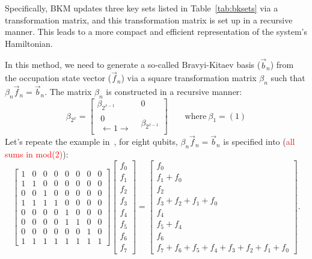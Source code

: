 Specifically, BKM updates three key sets listed in Table~\ref{tab:bksets} via a transformation matrix, and this transformation matrix is set up in a recursive manner. This leads to a more compact and efficient representation of the system's Hamiltonian.

In this method, we need to generate a so-called Bravyi-Kitaev basis ($\vec{b}_n$) from the occupation state vector ($\vec{f}_n$) via a square transformation matrix $\beta_n$ such that $\beta_n\vec{f}_n=\vec{b}_n$. The matrix $\beta_n$ is constructed in a recursive manner:
\begin{equation}
    \beta_{2^x}=\left[\begin{array}{c|c}
        \beta_{2^{x-1}} & 0 \\
        \hline
        \begin{matrix}
            0\\ \leftarrow 1 \rightarrow
        \end{matrix} & \beta_{2^{x-1}}
    \end{array}
        \right] \qquad \text{where} \: \beta_1=\left(1\right)
\end{equation}
Let's repeate the example in~\cite{transfer2015BKmapping}, for eight qubits, $\beta_n\vec{f}_n=\vec{b}_n$ is specified into (\textcolor{red}{all sums in mod(2)}): 
\begin{equation}
    \label{8bits}
    \begin{bmatrix}
        1&0&0&0&0&0&0&0\\
        1&1&0&0&0&0&0&0\\
        0&0&1&0&0&0&0&0\\
        1&1&1&1&0&0&0&0\\
        0&0&0&0&1&0&0&0\\
        0&0&0&0&1&1&0&0\\
        0&0&0&0&0&0&1&0\\
        1&1&1&1&1&1&1&1
    \end{bmatrix}
    \begin{bmatrix}
        f_0\\f_1\\f_2\\f_3\\f_4\\f_5\\f_6\\f_7
    \end{bmatrix}
    =
    \begin{bmatrix}
        f_0\\f_1+f_0\\f_2\\f_3+f_2+f_1+f_0\\
        f_4\\f_5+f_4\\f_6\\f_7+f_6+f_5+f_4+f_3+f_2+f_1+f_0
    \end{bmatrix}.
\end{equation}
